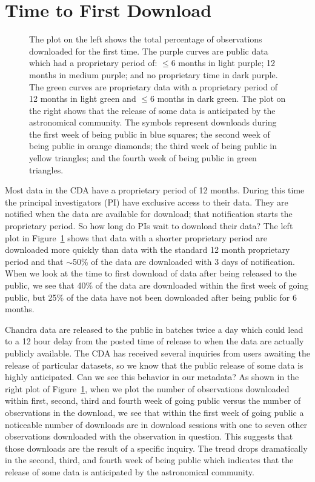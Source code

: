 \section{Time to First Download}
\label{sec:Time2FirstDownload}

\begin{figure}[top]
\caption[FirstDownload] 
  { \label{fig:FirstDownload}
The plot on the left shows the total percentage of observations downloaded for the first time.  The purple curves are public data which had a proprietary period of: $\leq 6$ months in light purple; 12 months in medium purple; and no proprietary time in dark purple. The green curves are proprietary data with a proprietary period of 12 months in light green and $\leq 6$ months in dark green.  The plot on the right shows that the release of some data is anticipated by the astronomical community.  The symbols represent downloads during the first week of being public in blue squares; the second week of being public in orange diamonds; the third week of being public in yellow triangles; and the fourth week of being public in green triangles.
}
\end{figure}
 
Most data in the CDA have a proprietary period of 12 months.  During this time the principal investigators (PI) have exclusive access to their data.  They are notified when the data are available for download; that notification starts the proprietary period.  So how long do PIs wait to download their data?  The left plot in Figure~\ref{fig:FirstDownload} shows that data with a shorter proprietary period are downloaded more quickly than data with the standard 12 month proprietary period and that $\sim$50\% of the data are downloaded with 3 days of notification.  When we look at the time to first download of data after being released to the public, we see that 40\% of the data are downloaded within the first week of going public, but 25\% of the data have not been downloaded after being public for 6 months.

Chandra data are released to the public in batches twice a day which could lead to a 12 hour delay from the posted time of release to when the data are actually publicly available.  The CDA has received several inquiries from users awaiting the release of particular datasets, so we know that the public release of some data is highly anticipated.  Can we see this behavior in our metadata?  As shown in the right plot of Figure~\ref{fig:FirstDownload}, when we plot the number of observations downloaded within first, second, third and fourth week of going public versus the number of observations in the download, we see that within the first week of going public a noticeable number of downloads are in download sessions with one to seven other observations downloaded with the observation in question.  This suggests that those downloads are the result of a specific inquiry.  The trend drops dramatically in the second, third, and fourth week of being public which indicates that the release of some data is anticipated by the astronomical community.

